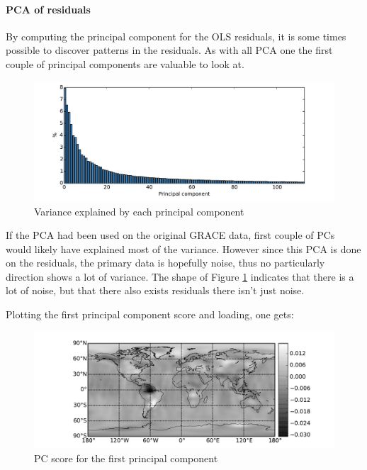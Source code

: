 
\paragraph{PCA of residuals}

By computing the principal component for the OLS residuals, it is some times possible to discover patterns in the residuals. As with all PCA one the first couple of principal components are valuable to look at.
\begin{figure}[H]
\centering
\includegraphics[width=1.0\textwidth]{figures/ols-pca-explained}
\caption{Variance explained by each principal component}
\label{fig:ols-pca-explained}
\end{figure}

If the PCA had been used on the original GRACE data, first couple of PCs would likely have explained most of the variance. However since this PCA is done on the residuals, the primary data is hopefully noise, thus no particularly direction shows a lot of variance. The shape of Figure \ref{fig:ols-pca-explained} indicates that there is a lot of noise, but that there also exists residuals there isn't just noise.

Plotting the first principal component score and loading, one gets:
\begin{figure}[H]
\centering
\includegraphics[width=1.0\textwidth]{figures/ols-pca-score-0}
\caption{PC score for the first principal component}
\label{fig:ols-pca-score-0}
\end{figure}

